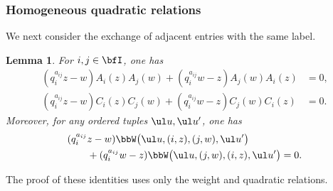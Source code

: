 \documentclass[reqno]{amsart}
\numberwithin{equation}{section}
\newtheorem*{lemma}{Lemma}
\begin{document}
\subsubsection{Homogeneous quadratic relations}
\label{app:internal-exchange}
We next consider the exchange of adjacent entries with the same label.
\begin{lemma}
	For $i,j\in\bfI$, one has
	\begin{equation}
		\begin{aligned}
			(q_i^{a_{ij}}z-w)A_i(z)A_j(w)+(q_i^{a_{ij}}w-z)A_j(w)A_i(z)&=0,\\
			(q_i^{a_{ij}}z-w)C_i(z)C_j(w)+(q_i^{a_{ij}}w-z)C_j(w)C_i(z)&=0.
		\end{aligned}
		\label{app:AC-internal-exchange}
	\end{equation}
	Moreover, for any ordered tuples $\ul u,\ul u'$, one has
	\begin{equation}
		\begin{aligned}
			&(q_i^{a_{ij}}z-w)\bbW\bigl(\ul u,(i,z),(j,w),\ul u'\bigr)\\
			&\qquad+(q_i^{a_{ij}}w-z)\bbW\bigl(\ul u,(j,w),(i,z),\ul u'\bigr)=0.
		\end{aligned}
		\label{app:B-internal-exchange}
	\end{equation}
\end{lemma}

The proof of these identities uses only the weight and quadratic relations.
\end{document}
